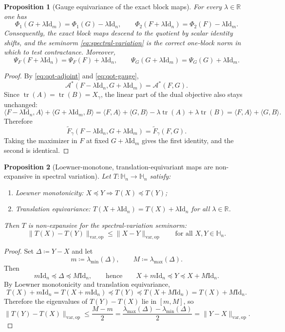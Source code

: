\documentclass[11pt]{article}
\newcommand{\RR}{\mathbb{R}}
\newcommand{\Id}{\mathrm{Id}}
\newcommand{\tr}{\operatorname{tr}}
\newcommand{\eqdef}{\coloneqq}
\newcommand{\dotp}[2]{\langle #1,#2\rangle}
\newcommand{\Hh}{\mathbb{H}}
\newcommand{\Aa}{\mathcal{A}}
\newcommand{\Ee}{\widetilde F}
\newcommand{\op}{\mathrm{op}}
\newcommand{\varop}{\mathrm{var},\op}
\theoremstyle{plain}
\newtheorem{proposition}{Proposition}[section]
\begin{document}
\begin{proposition}[Gauge equivariance of the exact block maps]
\label{prop:qot-gauge-equivariance}
For every $\lambda \in \RR$ one has
\[
\Phi_1(G+\lambda \Id_m)=\Phi_1(G)-\lambda \Id_n,
\qquad
\Phi_2(F+\lambda \Id_n)=\Phi_2(F)-\lambda \Id_m.
\]
Consequently, the exact block maps descend to the quotient by scalar identity shifts, and the seminorm \eqref{eq:spectral-variation} is the correct one-block norm in which to test contractance.
Moreover,
\[
\Psi_F(F+\lambda \Id_n)=\Psi_F(F)+\lambda \Id_n,
\qquad
\Psi_G(G+\lambda \Id_m)=\Psi_G(G)+\lambda \Id_m.
\]
\end{proposition}

\begin{proof}
By \eqref{eq:qot-adjoint} and \eqref{eq:qot-gauge},
\[
\Aa^\ast(F-\lambda \Id_n,G+\lambda \Id_m)=\Aa^\ast(F,G).
\]
Since $\tr(A)=\tr(B)=X_\gamma$, the linear part of the dual objective also stays unchanged:
\[
\dotp{F-\lambda \Id_n}{A}+\dotp{G+\lambda \Id_m}{B}
=
\dotp{F}{A}+\dotp{G}{B}-\lambda \tr(A)+\lambda \tr(B)
=
\dotp{F}{A}+\dotp{G}{B}.
\]
Therefore
\[
\Ee_\gamma(F-\lambda \Id_n,G+\lambda \Id_m)=\Ee_\gamma(F,G).
\]
Taking the maximizer in $F$ at fixed $G+\lambda \Id_m$ gives the first identity, and the second is identical.
\end{proof}

\begin{proposition}[Loewner-monotone, translation-equivariant maps are non-expansive in spectral variation]
\label{prop:qot-loewner-varop}
Let $T:\Hh_n \to \Hh_n$ satisfy:
\begin{enumerate}[label=\textnormal{(\roman*)}]
\item \emph{Loewner monotonicity:} $X \preceq Y \Rightarrow T(X)\preceq T(Y)$;
\item \emph{Translation equivariance:} $T(X+\lambda \Id_n)=T(X)+\lambda \Id_n$ for all $\lambda\in\RR$.
\end{enumerate}
Then $T$ is non-expansive for the spectral-variation seminorm:
\[
\|T(X)-T(Y)\|_{\varop}\le \|X-Y\|_{\varop}
\qquad\text{for all }X,Y\in \Hh_n.
\]
\end{proposition}

\begin{proof}
Set $\Delta \eqdef Y-X$ and let
\[
m \eqdef \lambda_{\min}(\Delta),
\qquad
M \eqdef \lambda_{\max}(\Delta).
\]
Then
\[
m \Id_n \preceq \Delta \preceq M \Id_n,
\qquad\text{hence}\qquad
X+m\Id_n \preceq Y \preceq X+M\Id_n.
\]
By Loewner monotonicity and translation equivariance,
\[
T(X)+m\Id_n = T(X+m\Id_n) \preceq T(Y) \preceq T(X+M\Id_n)=T(X)+M\Id_n.
\]
Therefore the eigenvalues of $T(Y)-T(X)$ lie in $[m,M]$, so
\[
\|T(Y)-T(X)\|_{\varop}
\le
\frac{M-m}{2}
=
\frac{\lambda_{\max}(\Delta)-\lambda_{\min}(\Delta)}{2}
=
\|Y-X\|_{\varop}.
\]
\end{proof}
\end{document}

